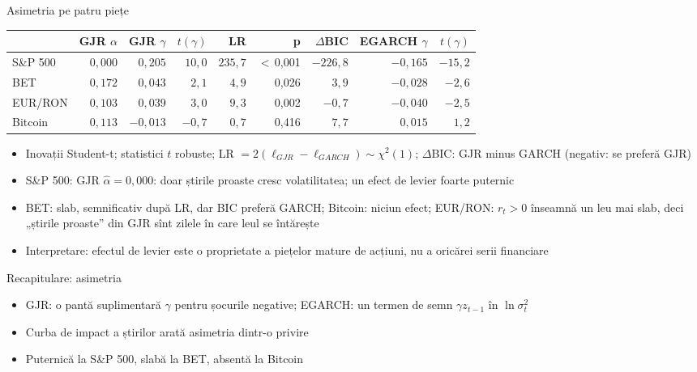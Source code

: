 \begin{frame}{Asimetria pe patru piețe}
\itemsize{\footnotesize}
\begin{center}
\scriptsize
\begin{tabular}{lrrrrrrrr}
\toprule
& GJR $\alpha$ & GJR $\gamma$ & $t(\gamma)$ & LR & p & $\Delta$BIC & EGARCH $\gamma$ & $t(\gamma)$ \\
\midrule
S\&P 500 & $0{,}000$ & $0{,}205$ & $10{,}0$ & $235{,}7$ & $<$\,0{,}001 & ${\ensuremath{-}226{,}8}$ & ${\ensuremath{-}0{,}165}$ & ${\ensuremath{-}15{,}2}$ \\
BET & $0{,}172$ & $0{,}043$ & $2{,}1$ & $4{,}9$ & 0{,}026 & ${3{,}9}$ & ${\ensuremath{-}0{,}028}$ & ${\ensuremath{-}2{,}6}$ \\
EUR/RON & $0{,}103$ & $0{,}039$ & $3{,}0$ & $9{,}3$ & 0{,}002 & ${\ensuremath{-}0{,}7}$ & ${\ensuremath{-}0{,}040}$ & ${\ensuremath{-}2{,}5}$ \\
Bitcoin & $0{,}113$ & $\ensuremath{-}0{,}013$ & $\ensuremath{-}0{,}7$ & $0{,}7$ & 0{,}416 & ${7{,}7}$ & ${0{,}015}$ & ${1{,}2}$ \\
\bottomrule
\end{tabular}
\end{center}
\begin{itemize}
    \item Inovații Student-t; statistici $t$ robuste; LR $= 2(\ell_{GJR} - \ell_{GARCH}) \sim \chi^2(1)$; $\Delta$BIC: GJR minus GARCH (negativ: se preferă GJR)
    \item S\&P 500: GJR $\hat\alpha = 0{,}000$: doar știrile proaste cresc volatilitatea; un efect de levier foarte puternic
    \item BET: slab, semnificativ după LR, dar BIC preferă GARCH; Bitcoin: niciun efect; EUR/RON: $r_t > 0$ înseamnă un leu mai slab, deci „știrile proaste” din GJR sînt zilele în care leul se întărește
    \item Interpretare: efectul de levier este o proprietate a piețelor mature de acțiuni, nu a oricărei serii financiare
\end{itemize}
\end{frame}

\begin{frame}{Recapitulare: asimetria}
\itemsize{\small}
\begin{itemize}
    \item GJR: o pantă suplimentară $\gamma$ pentru șocurile negative; EGARCH: un termen de semn $\gamma z_{t-1}$ în $\ln\sigma_t^2$
    \item Curba de impact a știrilor arată asimetria dintr-o privire
    \item Puternică la S\&P 500, slabă la BET, absentă la Bitcoin
\end{itemize}
\end{frame}


